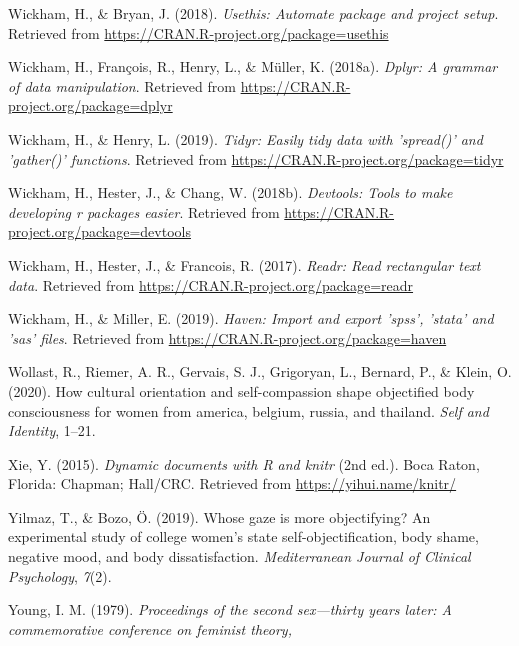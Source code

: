 \documentclass[
  man]{apa6}
\begin{document}
\leavevmode\hypertarget{ref-R-usethis}{}%
Wickham, H., \& Bryan, J. (2018). \emph{Usethis: Automate package and project setup}. Retrieved from \url{https://CRAN.R-project.org/package=usethis}

\leavevmode\hypertarget{ref-R-dplyr}{}%
Wickham, H., François, R., Henry, L., \& Müller, K. (2018a). \emph{Dplyr: A grammar of data manipulation}. Retrieved from \url{https://CRAN.R-project.org/package=dplyr}

\leavevmode\hypertarget{ref-R-tidyr}{}%
Wickham, H., \& Henry, L. (2019). \emph{Tidyr: Easily tidy data with 'spread()' and 'gather()' functions}. Retrieved from \url{https://CRAN.R-project.org/package=tidyr}

\leavevmode\hypertarget{ref-R-devtools}{}%
Wickham, H., Hester, J., \& Chang, W. (2018b). \emph{Devtools: Tools to make developing r packages easier}. Retrieved from \url{https://CRAN.R-project.org/package=devtools}

\leavevmode\hypertarget{ref-R-readr}{}%
Wickham, H., Hester, J., \& Francois, R. (2017). \emph{Readr: Read rectangular text data}. Retrieved from \url{https://CRAN.R-project.org/package=readr}

\leavevmode\hypertarget{ref-R-haven}{}%
Wickham, H., \& Miller, E. (2019). \emph{Haven: Import and export 'spss', 'stata' and 'sas' files}. Retrieved from \url{https://CRAN.R-project.org/package=haven}

\leavevmode\hypertarget{ref-wollast2020cultural}{}%
Wollast, R., Riemer, A. R., Gervais, S. J., Grigoryan, L., Bernard, P., \& Klein, O. (2020). How cultural orientation and self-compassion shape objectified body consciousness for women from america, belgium, russia, and thailand. \emph{Self and Identity}, 1--21.

\leavevmode\hypertarget{ref-R-knitr}{}%
Xie, Y. (2015). \emph{Dynamic documents with R and knitr} (2nd ed.). Boca Raton, Florida: Chapman; Hall/CRC. Retrieved from \url{https://yihui.name/knitr/}

\leavevmode\hypertarget{ref-yilmaz2019whose}{}%
Yilmaz, T., \& Bozo, Ö. (2019). Whose gaze is more objectifying? An experimental study of college women's state self-objectification, body shame, negative mood, and body dissatisfaction. \emph{Mediterranean Journal of Clinical Psychology}, \emph{7}(2).

\leavevmode\hypertarget{ref-young1979}{}%
Young, I. M. (1979). \emph{Proceedings of the second sex---thirty years later: A commemorative conference on feminist theory,}
\end{document}

